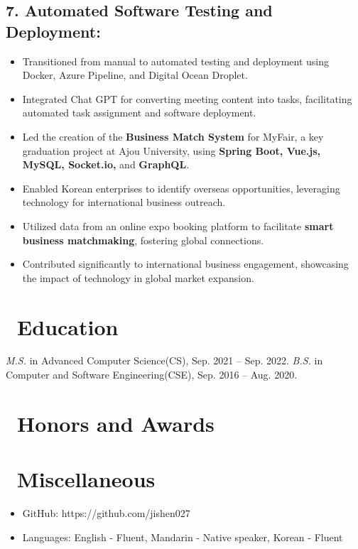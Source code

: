 \documentclass{resume}
\begin{document}
\subsection*{7. Automated Software Testing and Deployment:}
\begin{itemize}[noitemsep]
    \item Transitioned from manual to automated testing and deployment using Docker, Azure Pipeline, and Digital Ocean Droplet.
    \item Integrated Chat GPT for converting meeting content into tasks, facilitating automated task assignment and software deployment.
\end{itemize}


\begin{itemize}
  \item Led the creation of the \textbf{Business Match System} for MyFair, a key graduation project at Ajou University, using \textbf{Spring Boot, Vue.js, MySQL, Socket.io,} and \textbf{GraphQL}.
  \item Enabled Korean enterprises to identify overseas opportunities, leveraging technology for international business outreach.
  \item Utilized data from an online expo booking platform to facilitate \textbf{smart business matchmaking}, fostering global connections.
  \item Contributed significantly to international business engagement, showcasing the impact of technology in global market expansion.
\end{itemize}


\section{\faGraduationCap\ Education}
\textit{M.S.} in Advanced Computer Science(CS), Sep. 2021 -- Sep. 2022.
\textit{B.S.} in Computer and Software Engineering(CSE), Sep. 2016 -- Aug. 2020.

\section{\faHeartO\ Honors and Awards}

\section{\faInfo\ Miscellaneous}
\begin{itemize}[parsep=0.5ex]
  \item GitHub: https://github.com/jishen027
  \item Languages: English - Fluent, Mandarin - Native speaker, Korean - Fluent
\end{itemize}

%
%
\end{document}
